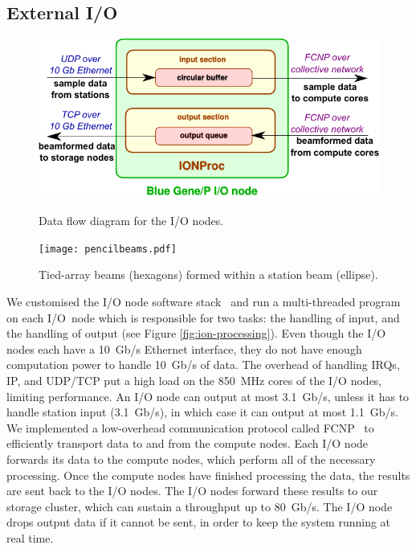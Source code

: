 \documentclass{llncs}
\begin{document}
\subsection{External I/O}
\label{Sec:Networks}

\begin{figure}[ht]
\begin{minipage}[t]{0.47\textwidth}
\includegraphics[width=\textwidth]{ION-processing.pdf}
\caption{Data flow diagram for the I/O nodes.}
\label{fig:ion-processing}
\end{minipage}
\hfill
\begin{minipage}[t]{0.4\textwidth}
\center
\texttt{[image: pencilbeams.pdf]}
\caption{Tied-array beams (hexagons) formed within a station beam (ellipse).}
\label{fig:pencilbeams}
\end{minipage}
\end{figure}

We customised the I/O node software stack~\cite{Yoshii:10} and run a multi-threaded program on each I/O~node which is responsible for two tasks: the handling of input, and the handling of output (see Figure \ref{fig:ion-processing}). Even though the I/O nodes each have a 10~Gb/s Ethernet interface, they do not have enough computation power to handle 10~Gb/s of data. The overhead of handling IRQs, IP, and UDP/TCP put a high load on the 850~MHz cores of the I/O nodes, limiting performance. An I/O node can output at most 3.1~Gb/s, unless it has to handle station input (3.1~Gb/s), in which case it can output at most 1.1~Gb/s. We implemented a low-overhead communication protocol called FCNP~\cite{Romein:09a} to efficiently transport data to and from the compute nodes. Each I/O node forwards its data to the compute nodes, which perform all of the necessary processing. Once the compute nodes have finished processing the data, the results are sent back to the I/O nodes. The I/O nodes forward these results to our storage cluster, which can sustain a throughput up to 80~Gb/s. The I/O node drops output data if it cannot be sent, in order to keep the system running at real time.
\end{document}
